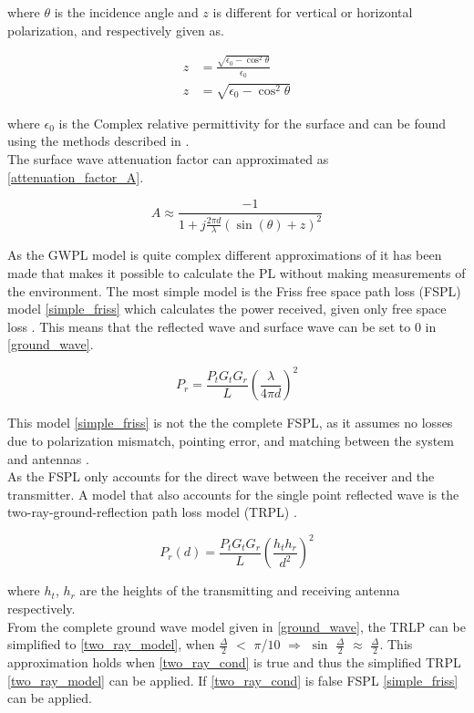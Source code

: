 where $\theta$ is the incidence angle and $z$ is different for vertical or horizontal polarization, and respectively given as.

\begin{align}
z &= \frac{\sqrt{\epsilon_{0}-\cos^{2}\theta}}{\epsilon_{0}} \\
z &= \sqrt{\epsilon_{0}-\cos^{2}\theta}
\end{align}

where $\epsilon_{0}$ is the Complex relative permittivity for the surface and can be found using the methods described in \cite{Kim}.\\
The surface wave attenuation factor can approximated as \eqref{attenuation_factor_A}\cite{Chong, Bullington}. 


\begin{equation}
A \approx \frac{-1}{1+j\frac{2\pi d}{\lambda}(\sin(\theta)+z)^{2}}
\label{attenuation_factor_A}
\end{equation}


As the GWPL model is quite complex different approximations of it has been made that makes it possible to calculate the PL without making measurements of the environment. The most simple model is the Friss free space path loss (FSPL) model \eqref{simple_friss} which calculates the power received, given only free space loss \cite{Chong}. This means that the reflected wave and surface wave can be set to 0 in \eqref{ground_wave}. 

\begin{equation}
P_r = \frac{P_t G_t G_r}{L} \left(\frac{\lambda}{4 \pi d}\right)^2
\label{simple_friss}
\end{equation}

This model \eqref{simple_friss} is not the the complete FSPL, as it assumes no losses due to polarization mismatch, pointing error, and matching between the system and antennas \cite{full_friss}. \\



As the FSPL only accounts for the direct wave between the receiver and the transmitter. A model that also accounts for the single point reflected wave is the two-ray-ground-reflection path loss model (TRPL) \cite{two_ray}. 

\begin{equation}
P_r(d) = \frac{P_t G_t G_r }{L}\left(\frac{h_t h_r}{d^2}\right)^2
\label{two_ray_model}
\end{equation}

where $h_t$, $h_r$ are the heights of the transmitting and receiving antenna respectively. \\
From the complete ground wave model given in \eqref{ground_wave}, the TRLP can be simplified to \eqref{two_ray_model}, when $\frac{\Delta}{2}$ $<$ $\pi$/$10$ $\Rightarrow$ $\sin$ $\frac{\Delta}{2}$ $\approx$ $\frac{\Delta}{2}$. This approximation holds when \eqref{two_ray_cond} is true and thus the simplified TRPL \eqref{two_ray_model} can be applied. If \eqref{two_ray_cond} is false FSPL \eqref{simple_friss} can be applied.
  
